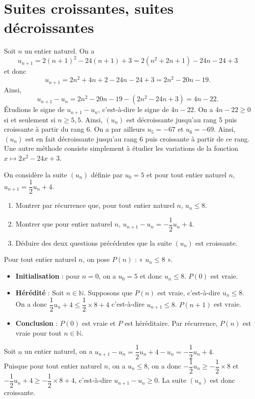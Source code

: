 \documentclass[11pt,fleqn]{book} %
\begin{document}
\newpage
\section*{Suites croissantes, suites décroissantes}



\begin{solution}Soit $n$ un entier naturel. On a
\[ u_{n+1}=2(n+1)^2-24(n+1)+3=2(n^2+2n+1)-24n-24+3\]
et donc
\[u_{n+1}=2n^2+4n+2-24n-24+3=2n^2-20n-19.\]
Ainsi,
\[ u_{n+1}-u_n = 2n^2-20n-19-(2n^2-24n+3)=4n-22.\]
Étudions le signe de $u_{n+1}-u_n$, c'est-à-dire le signe de $4n-22$. On a $4n-22 \geqslant 0$ si et seulement si $n \geqslant 5,5$. Ainsi, $(u_n)$ est décroissante jusqu'au rang 5 puis croissante à partir du rang 6. On a par ailleurs $u_5=-67$ et $u_6=-69$. Ainsi, $(u_n)$ est en fait décroissante jusqu'au rang 6 puis croissante à partir de ce rang. Une autre méthode consiste simplement à étudier les variations de la fonction $x\mapsto 2x^2-24x+3$.\end{solution}

\begin{exercise}
On considère la suite $(u_n)$ définie par $u_0=5$ et pour tout entier naturel $n$, $u_{n+1}=\dfrac{1}{2}u_n+4$.
\begin{enumerate}
\item Montrer par récurrence que, pour tout entier naturel $n$, $u_n \leqslant 8$.
\item Montrer que pour entier naturel $n$, $u_{n+1}-u_n = -\dfrac{1}{2}u_n+4$.
\item Déduire des deux questions précédentes que la suite $(u_n)$ est croissante.
\end{enumerate}\end{exercise}
\begin{solution}
Pour tout entier naturel $n$, on pose $P(n)$ : « $u_n \leqslant 8$ ».

\begin{itemize}
\item \textbf{Initialisation} : pour $n=0$, on a $u_0=5$ et donc $u_n \leqslant 8$. $P(0)$ est vraie.
\item \textbf{Hérédité} : Soit $n\in\mathbb{N}$. Supposons que $P(n)$ est vraie, c'est-à-dire $u_n \leqslant 8$. \\On a donc $\dfrac{1}{2}u_n+4 \leqslant \dfrac{1}{2}\times 8 +4$ c'est-à-dire $u_{n+1} \leqslant 8$. $P(n+1)$ est vraie.
\item \textbf{Conclusion} : $P(0)$ est vraie et $P$ est héréditaire. Par récurrence, $P(n)$ est vraie pour tout $n\in\mathbb{N}$.
\end{itemize}
Soit $n$ un entier naturel, on a $u_{n+1}-u_n = \dfrac{1}{2}u_n+4-u_n = -\dfrac{1}{2}u_n+4$.\\
Puisque pour tout entier naturel $n$, on a $u_n \leqslant 8$, on a donc $-\dfrac{1}{2}u_n \geqslant -\dfrac{1}{2} \times 8$ et $-\dfrac{1}{2}u_n+4 \geqslant -\dfrac{1}{2}\times 8 +4$, c'est-à-dire $u_{n+1}-u_n \geqslant 0$. La suite $(u_n)$ est donc croissante.\end{solution}
\end{document}
